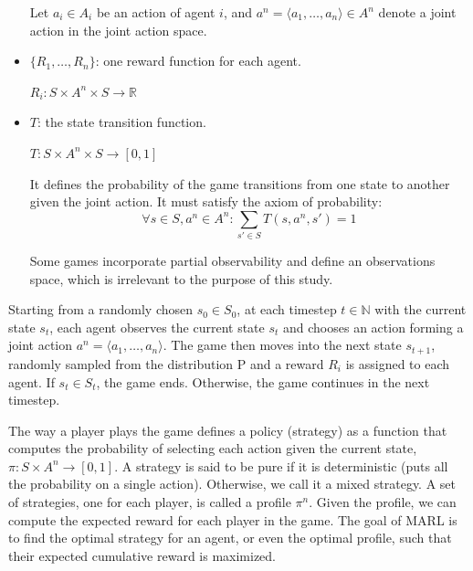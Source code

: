\documentclass[a4paper]{article}
\begin{document}
\begin{multicols}{2}
\begin{itemize}
    Let $a_i \in A_i$ be an action of agent $i$, and $a^n=\langle a_1,\ldots,a_n \rangle \in A^n$ denote a joint action in the joint action space.
    \item $\{R_1,\ldots,R_n\}$: one reward function for each agent.

    $R_i:S \times A^n \times S \rightarrow \mathbb{R}$
    \item $T$: the state transition function.

    $T:S \times A^n \times S \rightarrow [0,1]$

    It defines the probability of the game transitions from one state to another given the joint action. It must satisfy the axiom of probability:
    \begin{equation}
    \forall s \in S,a^n \in A^n: \sum_{s' \in S}{T(s,a^n,s')}=1
    \label{eq:state_transition}
    \end{equation}

    Some games incorporate partial observability and define an observations space, which is irrelevant to the purpose of this study.
\end{itemize}

Starting from a randomly chosen $s_0 \in S_0$, at each timestep $t \in \mathbb{N}$ with the current state $s_t$, each agent observes the current state $s_t$ and chooses an action forming a joint action $a^n=\langle a_1,\ldots,a_n \rangle$. The game then moves into the next state $s_{t+1}$, randomly sampled from the distribution P and a reward $R_i$ is assigned to each agent. If $s_t \in S_t$, the game ends. Otherwise, the game continues in the next timestep.

The way a player plays the game defines a policy (strategy) as a function that computes the probability of selecting each action given the current state, $\pi:S \times A^n \rightarrow [0,1]$. A strategy is said to be pure if it is deterministic (puts all the probability on a single action). Otherwise, we call it a mixed strategy. A set of strategies, one for each player, is called a profile $\pi^n$. Given the profile, we can compute the expected reward for each player in the game. The goal of MARL is to find the optimal strategy for an agent, or even the optimal profile, such that their expected cumulative reward is maximized.


\end{multicols}
\end{document}
